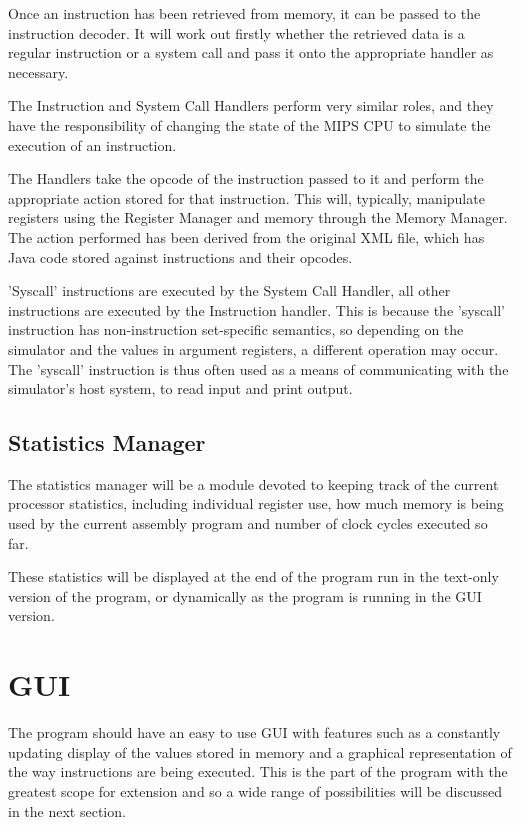 \documentclass[12pt]{report}
\begin{document}
Once an instruction has been retrieved from memory, it can be passed to the instruction decoder. It will work out firstly whether the retrieved data is a regular instruction or a system call and pass it onto the appropriate handler as necessary.

The Instruction and System Call Handlers perform very similar roles, and they have the responsibility of changing the state of the MIPS CPU to simulate the execution of an instruction.

The Handlers take the opcode of the instruction passed to it and perform the appropriate action stored for that instruction. This will, typically, manipulate registers using the Register Manager and memory through the Memory Manager. The action performed has been derived from the original XML file, which has Java code stored against instructions and their opcodes. 

'Syscall' instructions are executed by the System Call Handler, all other instructions are executed by the Instruction handler. This is because the 'syscall' instruction has non-instruction set-specific semantics, so depending on the simulator and the values in argument registers, a different operation may occur. The 'syscall' instruction is thus often used as a means of communicating with the simulator's host system, to read input and print output.



\subsection{Statistics Manager}

The statistics manager will be a module devoted to keeping track of the current processor statistics, including individual register use, how much memory is being used by the current assembly program and number of clock cycles executed so far.

These statistics will be displayed at the end of the program run in the text-only version of the program, or dynamically as the program is running in the GUI version.



\section{GUI}

The program should have an easy to use GUI with features such as a constantly updating display of the values stored in memory and a graphical representation of the way instructions are being executed.  This is the part of the program with the greatest scope for extension and so a wide range of possibilities will be discussed in the next section.
\end{document}
